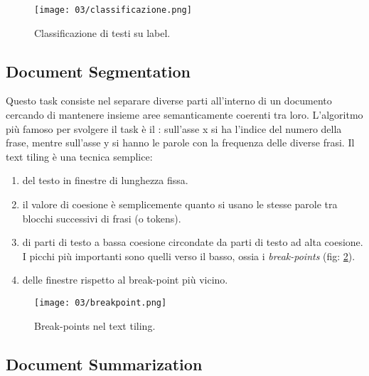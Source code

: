 \begin{figure}[h]
    \centering
    \texttt{[image: 03/classificazione.png]}
    \caption{Classificazione di testi su label.}
    \label{fig:class}
\end{figure}

\subsection{Document Segmentation}

Questo task consiste nel separare diverse parti all'interno di un documento cercando di mantenere insieme aree semanticamente coerenti tra loro. L'algoritmo più famoso per svolgere il task è  il : sull'asse x si ha l'indice del numero della frase, mentre sull'asse y si hanno le parole con la frequenza delle diverse frasi. Il text tiling è una tecnica semplice:

\begin{enumerate}
  \item {} del testo in finestre di lunghezza fissa. 
  \item {} il valore di coesione è semplicemente quanto si usano le stesse parole tra blocchi successivi di frasi (o tokens). 
  \item {} di parti di testo a bassa coesione circondate da parti di testo ad alta coesione. I picchi più importanti sono quelli verso il basso, ossia i \textit{break-points} (fig: \ref{fig:bp}). 
  \item {} delle finestre rispetto al break-point più vicino.
\end{enumerate}



\begin{figure}[h]
    \centering
    \texttt{[image: 03/breakpoint.png]}
    \caption{Break-points nel text tiling.}
    \label{fig:bp}
\end{figure}

\subsection{Document Summarization}

